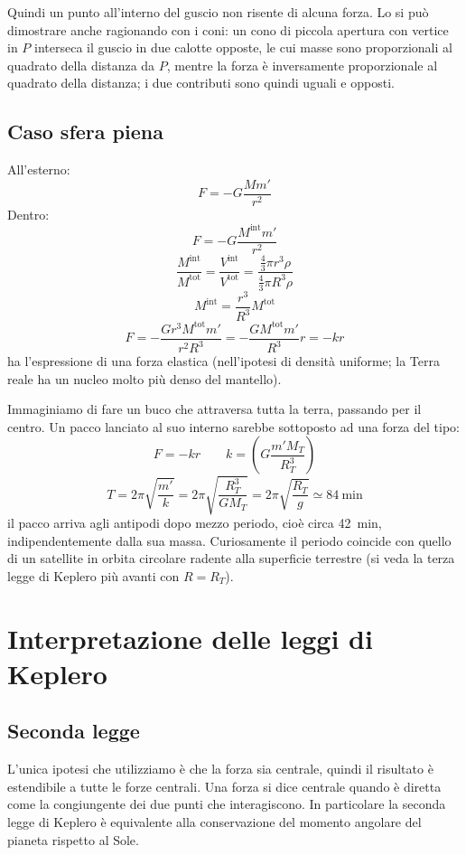 Quindi un punto all'interno del guscio non risente di alcuna
forza. Lo si può dimostrare anche ragionando con i coni: un cono di piccola apertura con vertice in $P$ interseca il guscio in due calotte opposte, le cui masse sono proporzionali al quadrato della distanza da $P$, mentre la forza è inversamente proporzionale al quadrato della distanza; i due contributi sono quindi uguali e opposti.
\subsection{Caso sfera piena}
All'esterno:
\[F=-G\frac{Mm'}{r^2}\]
Dentro:
\[F=-G\frac{M^{\text{int}}m'}{r^2}\]
\[\frac{M^{\text{int}}}{M^{\text{tot}}}=\frac{V^{\text{int}}}{V^{\text{tot}}}=\frac{\frac{4}{3}\pi r^3\rho}{\frac{4}{3}\pi R^3\rho}\]
\[M^{\text{int}}=\frac{r^3}{R^3}M^{\text{tot}}\]
\[F=-\frac{Gr^3M^{\text{tot}}m'}{r^2R^3}=-\frac{GM^{\text{tot}}m'}{R^3}r=-kr\]
ha l'espressione di una forza elastica (nell'ipotesi di densità uniforme; la Terra reale ha un nucleo molto più denso del mantello).

\begin{Es}
  Immaginiamo di fare un buco che attraversa tutta la terra, passando per il centro. Un pacco lanciato al suo interno sarebbe sottoposto ad una forza del tipo:
  \[F=-kr\qquad k=\left(G\frac{m'M_T}{R_T^3}\right)\]
  \[
    T=2\pi\sqrt{\frac{m'}{k}}=2\pi\sqrt{\frac{R_T^3}{GM_T}}=2\pi\sqrt{\frac{R_T}{g}}\simeq \SI{84}{\minute} \]
  il pacco arriva agli antipodi dopo mezzo periodo, cioè circa \SI{42}{\minute}, indipendentemente dalla sua massa. Curiosamente il periodo coincide con quello di un satellite in orbita circolare radente alla superficie terrestre (si veda la terza legge di Keplero più avanti con $R=R_T$).
\end{Es}
\section{Interpretazione delle leggi di Keplero}
\subsection{Seconda legge}

L'unica ipotesi che utilizziamo è che la forza sia centrale,
quindi il risultato è estendibile a tutte le forze centrali. Una
forza si dice centrale quando è diretta come la congiungente dei
due punti che interagiscono. In particolare la seconda legge di Keplero è equivalente alla conservazione del momento angolare del pianeta rispetto al Sole.

